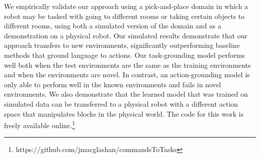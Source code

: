 \documentclass[conference]{IEEEtran}
\begin{document}

We empirically validate our approach using a
pick-and-place domain in which a robot may be tasked with going to
different rooms or taking certain objects to different rooms, using both a simulated version of the domain and
as a demonstration on a physical robot.  Our simulated results
demonstrate that our approach transfers to new environments,
significantly outperforming baseline methods that ground language to
actions.  
Our task-grounding
model performs well both when the test environments are the same as
the training environments and when the environments are novel. In
contrast, an action-grounding model is only able to perform well in
the known environments and fails in novel environments.  We also
demonstrate that the learned model that was trained on simulated
data can be transferred to a physical robot with a different action
space that manipulates blocks in the physical world. The code for 
this work is freely available online.\footnote{https://github.com/jmacglashan/commandsToTasks}


\end{document}
